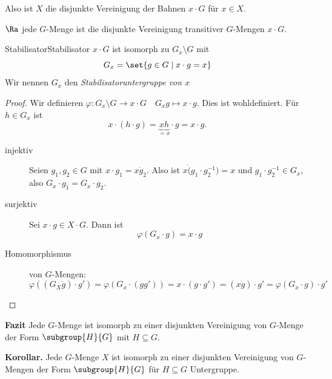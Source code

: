\documentclass[language=ngerman]{TemplateLecture} %
\begin{document}
Also ist \(X\) die disjunkte Vereinigung der Bahnen \(x \cdot G\) für \(x \in X\).

\(\Ra\) jede \(G\)-Menge ist die disjunkte Vereinigung transitiver \(G\)-Mengen \(x\cdot G\).

\begin{lem}{Stabilisator}{Stabilisator}
    \(x \cdot G\) ist isomorph zu \(G_x \setminus G\) mit
    \[G_x = \set{g \in G\mid x \cdot g = x}\]
    Wir nennen \(G_x\) den \emph{Stabilisatoruntergruppe von \(x\)}
\end{lem}

\begin{proof}
    Wir definieren \(\varphi\colon G_x\setminus G \to x \cdot G \quad G_x g \mapsto x \cdot g\).
    Dies ist wohldefiniert. Für \(h \in G_x\) ist
    \[x \cdot (h\cdot g) = \underbrace{x h}_{ = x} \cdot g = x\cdot g.\]
    \begin{description}
        \item[injektiv] Seien \(g_1, g_2 \in G\) mit \(x\cdot g_1 = x \dot g_2\). Also ist \(x \dot (g_1 \cdot g_2^{-1}) = x\) und \(g_1 \cdot g_2^{-1} \in G_x\), also \(G_x \cdot g_1 = G_x \cdot g_2\).
        \item[surjektiv] Sei \(x \cdot g \in X\cdot G\). Dann ist
        \[\varphi(G_x \cdot g) = x\cdot g\]
        \item[Homomorphismus] von \(G\)-Mengen:
        \[\varphi((G_X\dot g)\cdot g') = \varphi(G_x\cdot (gg')) = x \cdot (g\cdot g') = (x \dot g) \cdot g' = \varphi(G_x\cdot g) \cdot g'\]
    \end{description}
\end{proof}

\textbf{Fazit} Jede \(G\)-Menge ist isomorph zu einer disjunkten Vereinigung von \(G\)-Menge der Form \(\subgroup{H}{G}\) mit \(H\subseteq G\).




\textbf{Korollar.} Jede $G$-Menge $X$ ist isomorph zu einer disjunkten Vereinigung von $G$-Mengen der Form $\subgroup{H}{G}$ für $H \subseteq G$ Untergruppe. 
\end{document}
